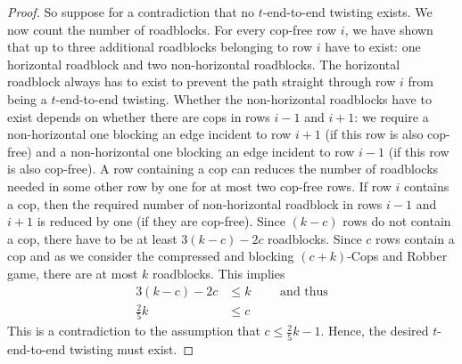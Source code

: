 \documentclass[10pt,a4paper]{article}
\begin{document}
\begin{proof}
So suppose for a contradiction that no $t$-end-to-end twisting exists. We now count the number of roadblocks.
For every cop-free row $i$, we have shown that up to three additional roadblocks belonging to row $i$ have to exist:
	one horizontal roadblock and two non-horizontal roadblocks. The horizontal roadblock always has to exist to prevent the path straight through row $i$ from being a $t$-end-to-end twisting. Whether the non-horizontal roadblocks have to exist depends on whether there are cops in rows $i-1$ and $i+1$: we require
	a non-horizontal one blocking an edge incident to row $i+1$ (if this row is also cop-free)
	and a non-horizontal one blocking an edge incident to row $i-1$ (if this row is also cop-free).
	A row containing a cop can reduces the number of roadblocks needed in some other row by one for at most two cop-free rows. If row $i$ contains a cop,
	then the required number of non-horizontal roadblock in rows $i-1$ and $i+1$ is reduced by one
	(if they are cop-free).
	Since $(k-c)$ rows do not contain a cop, there have to be at least
	$3(k-c) - 2c$ roadblocks.
	Since $c$ rows contain a cop and as we consider the compressed and blocking $(c+k)$-Cops and Robber game,
	there are at most $k$ roadblocks.
	This implies 
	\begin{align*}
		3(k-c)-2c &\leq k  \qquad\text { and thus} \\
		\frac{2}{5}k &\leq c 
	\end{align*}
	This is a contradiction to the assumption that
	$c \leq \frac{2}{5}k - 1$.
	Hence, the desired $t$-end-to-end twisting must exist.
\end{proof}
 
\end{document}
